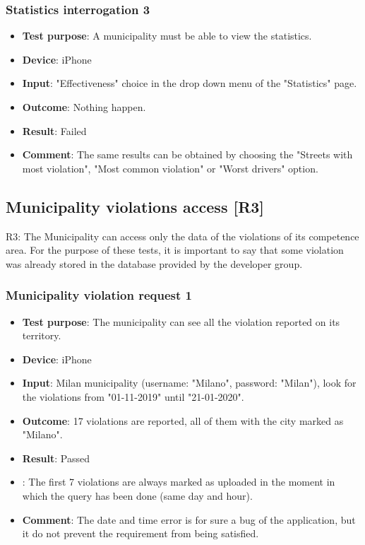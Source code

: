 \documentclass[../ATD.tex]{subfiles}
\begin{document}
    \subsubsection{Statistics interrogation 3}\label{subsubsec:statistics-interrogation-3}
    \begin{itemize}
        \item \textbf{Test purpose}: A municipality must be able to view the statistics.
        \item \textbf{Device}: iPhone
        \item \textbf{Input}: "Effectiveness" choice in the drop down menu of the "Statistics" page.
        \item \textbf{Outcome}: Nothing happen.
        \item \textbf{Result}: Failed
        \item \textbf{Comment}: The same results can be obtained by choosing the "Streets with most violation", "Most common violation" or "Worst drivers" option.
    \end{itemize}

    \subsection{Municipality violations access [R3]}\label{subsec:municipality-report-access}
    R3: The Municipality can access only the data of the violations of its competence area.
    \newline
    For the purpose of these tests, it is important to say that some violation was already stored in the database provided by the developer group.
    \subsubsection{Municipality violation request 1}\label{subsubsec:municiplaity-violation-request-1}
    \begin{itemize}
        \item \textbf{Test purpose}: The municipality can see all the violation reported on its territory.
        \item \textbf{Device}: iPhone
        \item \textbf{Input}: Milan municipality (username: "Milano", password: "Milan"), look for the violations from "01-11-2019" until "21-01-2020".
        \item \textbf{Outcome}: 17 violations are reported, all of them with the city marked as "Milano".
        \item \textbf{Result}: Passed
        \item {}: The first 7 violations are always marked as uploaded in the moment in which the query has been done (same day and hour).
        \item \textbf{Comment}: The date and time error is for sure a bug of the application, but it do not prevent the requirement from being satisfied.
    \end{itemize}
\end{document}
